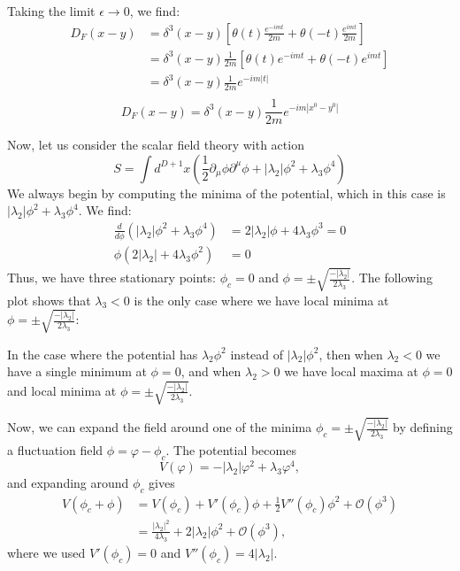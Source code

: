 \documentclass[12pt]{article}
\newcommand{\delmu}{\partial_{\mu}}
\newcommand{\delMu}{\partial^{\mu}}
\begin{document}
Taking the limit $\epsilon \to 0$, we find:
\begin{align*}
    D_F(x-y) &= \delta^3(x-y) \left[ \theta(t) \frac{e^{-imt}}{2m} +  \theta(-t)
    \frac{e^{imt}}{2m} \right] \\
    &= \delta^3(x-y) \frac{1}{2m} \left[ \theta(t) e^{-imt} +  \theta(-t) e^{imt}
    \right] \\
    &= \delta^3(x-y) \frac{1}{2m} e^{-im|t|} \\
\end{align*}
\begin{equation}
    \boxed{D_F(x-y) = \delta^3(x-y) \frac{1}{2m} e^{-im|x^0 - y^0|}}
\end{equation}

Now, let us consider the scalar field theory with action 
\begin{equation}
    S =  \int d^{D+1}x \left( \frac{1}{2}\delmu\phi\delMu\phi + |\lambda_2|\phi^2 + \lambda_3\phi^4 \right)
\end{equation}
We always begin by computing the minima of the potential, which  in this case is $|\lambda_2|\phi^2 + \lambda_3\phi^4$. We find:
\begin{align*}
    \frac{d}{d\phi} (|\lambda_2|\phi^2 + \lambda_3\phi^4) &= 2|\lambda_2|\phi + 4\lambda_3\phi^3 = 0 \\
    \phi(2|\lambda_2| + 4\lambda_3\phi^2) &= 0
\end{align*}
Thus, we have three stationary points: $\phi_c = 0$ and $\phi = \pm
\sqrt{\frac{-|\lambda_2|}{2\lambda_3}}$. The following plot shows that $\lambda_3 < 0$ is 
the only case where we have local minima at $\phi = \pm \sqrt{\frac{-|\lambda_2|}{2\lambda_3}}$:
\begin{center}
\end{center}
In the case where the potential has $\lambda_2\phi^2$ instead of
$|\lambda_2|\phi^2$, then when $\lambda_2 < 0$ we have a single minimum at $\phi = 0$,
and when $\lambda_2 > 0$ we have local maxima at $\phi = 0$ and local minima at $\phi = \pm
\sqrt{\frac{-|\lambda_2|}{2\lambda_3}}$.

Now, we can expand the field around one of the minima $\phi_c = \pm
\sqrt{\frac{-|\lambda_2|}{2\lambda_3}}$ by defining a fluctuation field
$\phi = \varphi - \phi_c$. The potential becomes
\begin{equation}
    V(\varphi) = -|\lambda_2|\varphi^2 + \lambda_3 \varphi^4,
\end{equation}
and expanding around $\phi_c$ gives
\begin{align}
    V(\phi_c + \phi)
    &= V(\phi_c) + V'(\phi_c)\phi + \frac{1}{2}V''(\phi_c)\phi^2 + \mathcal{O}(\phi^3) \\
    &= \frac{|\lambda_2|^2}{4\lambda_3} + 2|\lambda_2|\phi^2 + \mathcal{O}(\phi^3),
\end{align}
where we used $V'(\phi_c) = 0$ and $V''(\phi_c) = 4|\lambda_2|$.
\end{document}
